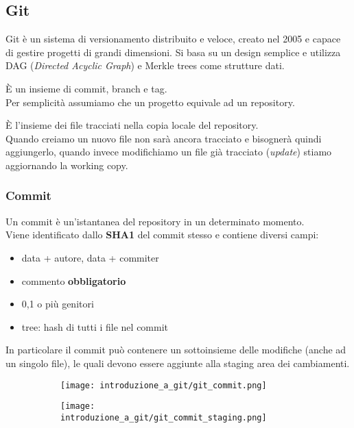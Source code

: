 \documentclass[12pt]{article}
\begin{document}
    \subsection{Git}
    Git è un sistema di versionamento distribuito e veloce, creato nel 2005 e capace di gestire progetti di grandi dimensioni.
    Si basa su un design semplice e utilizza DAG (\textit{Directed Acyclic Graph}) e Merkle trees come strutture dati.
    \begin{definition}[Repository]
      È un insieme di commit, branch e tag.\\
      Per semplicità assumiamo che un progetto equivale ad un repository.
    \end{definition}
    \begin{definition}
      È l'insieme dei file tracciati nella copia locale del repository.\\
      Quando creiamo un nuovo file non sarà ancora tracciato e bisognerà quindi aggiungerlo, quando invece modifichiamo un file già tracciato (\textit{update}) stiamo aggiornando la working copy.
    \end{definition}
    
    \subsubsection{Commit}
    Un commit è un'istantanea del repository in un determinato momento.\\
    Viene identificato dallo \textbf{SHA1} del commit stesso e contiene diversi campi:
    \begin{itemize}
      \item data + autore, data + commiter
      \item commento \textbf{obbligatorio}
      \item 0,1 o più genitori
      \item tree: hash di tutti i file nel commit
    \end{itemize}
    \begin{minipage}{\textwidth}
      In particolare il commit può contenere un sottoinsieme delle modifiche (anche ad un singolo file), le quali devono essere aggiunte alla staging area dei cambiamenti.
      \begin{figure}[H]
        \centering
        \begin{subfigure}{0.49\textwidth}
          \centering
          \texttt{[image: introduzione\_a\_git/git\_commit.png]}
        \end{subfigure}
        \hfill
        \begin{subfigure}{0.49\textwidth}
          \centering
          \texttt{[image: introduzione\_a\_git/git\_commit\_staging.png]}
        \end{subfigure}
      \end{figure}
    \end{minipage}
\end{document}
